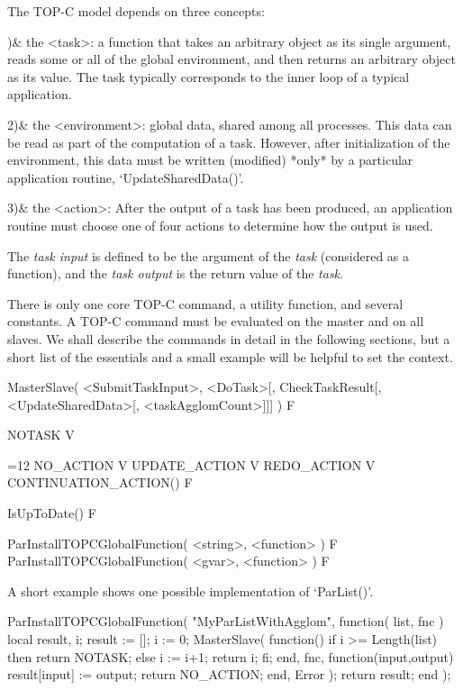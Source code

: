 The TOP-C model depends on three concepts:

)& the <task>: a function that takes an arbitrary object as
              its single argument, reads some or all of the global
              environment, and then returns an arbitrary object as its
              value.  The task typically corresponds to the inner loop
              of a typical application.

2)& the <environment>: global data, shared among all processes.  This
        data can be read as part of the computation of a task.
        However, after initialization of the environment, this data
        must be written (modified) *only* by a particular application
        routine, `UpdateSharedData()'.

3)& the <action>:  After the output of a task has been produced, an
            application routine must choose one of four actions to
            determine how the output is used.
\enditems

The {\it task input} is defined to be the argument of the {\it task}
(considered as a function), and the {\it task output} is the return
value of the {\it task}.



There is only one core TOP-C command, a utility function, and several
constants.  A TOP-C command must be evaluated on the master and on all
slaves.  We shall describe the commands in detail in the following
sections, but a short list of the essentials and a small example
will be helpful to set the context.

\>MasterSlave( <SubmitTaskInput>, <DoTask>[, CheckTaskResult[, <UpdateSharedData>[,
               <taskAgglomCount>]]] ) F

\>NOTASK V


{=12
\>NO_ACTION V
\>UPDATE_ACTION V
\>REDO_ACTION V
\>CONTINUATION_ACTION() F
\par}

\>IsUpToDate() F

\>ParInstallTOPCGlobalFunction( <string>, <function> ) F
\>ParInstallTOPCGlobalFunction( <gvar>, <function> ) F

A short example shows one possible implementation of `ParList()'.

\beginexample
ParInstallTOPCGlobalFunction( "MyParListWithAgglom",
function( list, fnc )
  local result, i;
  result := []; i := 0;
  MasterSlave( function() if i >= Length(list) then return NOTASK;
                          else i := i+1; return i; fi; end,
               fnc,
               function(input,output) result[input] := output;
                                      return NO_ACTION; end,
               Error
             );
  return result;
end );
\endexample

